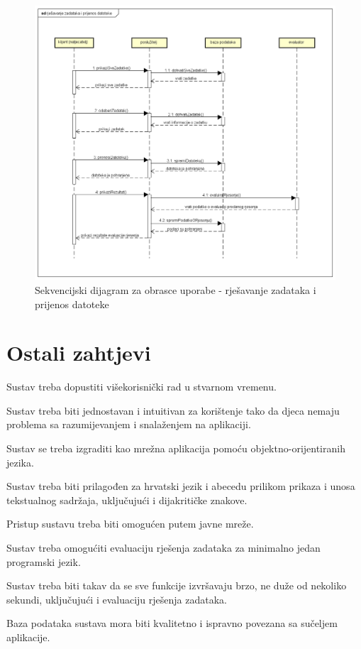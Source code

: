 				\begin{figure}[H]
					\includegraphics[scale=0.5]{dijagrami/sd10_sd13.png} 
					\centering
					\caption{Sekvencijski dijagram za obrasce uporabe -  rješavanje zadataka i prijenos datoteke}
					\label{fig:sekvencijski3}
				\end{figure}
				

				\eject	
		\section{Ostali zahtjevi}
			 
			 \begin{packed_item}
			 	
			 	\item Sustav treba dopustiti višekorisnički rad u stvarnom vremenu.
			 	\item Sustav treba biti jednostavan i intuitivan za korištenje tako da djeca nemaju problema sa razumijevanjem i snalaženjem na aplikaciji.
			 	\item Sustav se treba izgraditi kao mrežna aplikacija pomoću objektno-orijentiranih jezika.
			 	\item Sustav treba biti prilagođen za hrvatski jezik i abecedu prilikom prikaza i unosa tekstualnog sadržaja, uključujući i dijakritičke znakove.
			 	\item Pristup sustavu treba biti omogućen putem javne mreže.
			 	\item Sustav treba omogućiti evaluaciju rješenja zadataka za minimalno jedan programski jezik.
			 	\item Sustav treba biti takav da se sve funkcije izvršavaju brzo, ne duže od nekoliko sekundi, uključujući i evaluaciju rješenja zadataka.
			 	\item Baza podataka sustava mora biti kvalitetno i ispravno povezana sa sučeljem aplikacije.
			 	
			 \end{packed_item}
			 
	